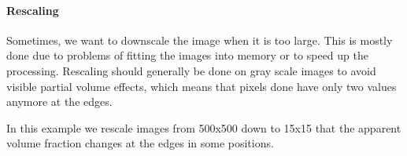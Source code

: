 \documentclass[letterpaper,10pt,english]{sphinxmanual}
\begin{document}
\paragraph{Rescaling}
\label{\detokenize{04-BasicSegmentation_Part2:rescaling}}
\sphinxAtStartPar
Sometimes, we want to downscale the image when it is too large. This is mostly done due to problems of fitting the images into memory or to speed up the processing. Rescaling should generally be done on gray scale images to avoid visible partial volume effects, which means that pixels done have only two values anymore at the edges.

\sphinxAtStartPar
In this example we rescale images from 500x500 down to 15x15 that the apparent volume fraction changes at the edges in some positions.

\begin{sphinxVerbatim}[commandchars=\\\{\}]
  \PYG{p}{[}    \PYG{p}{]}
       
      
        
     
                   \PYG{p}{[}\PYG{p}{]}   

\end{sphinxVerbatim}
\end{document}
